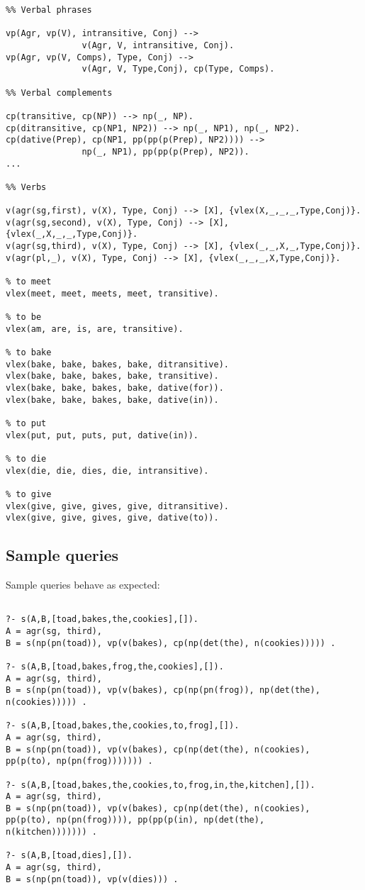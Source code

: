 \documentclass[12pt]{article}
\makeatletter
\newenvironment{problem x}{\@startsection
       {section}
       {1}
       {-.2em}
       {-3.5ex plus -1ex minus -.2ex}
       {2.3ex plus .2ex}
       {\pagebreak[3] %
       \large\bf\noindent{Problem }
       }
       }
       {%
       \begin{center}\large\bf \ldots\ldots\ldots\end{center}}
\makeatother
\begin{document}
    \begin{verbatim}
%% Verbal phrases

vp(Agr, vp(V), intransitive, Conj) -->
               v(Agr, V, intransitive, Conj).
vp(Agr, vp(V, Comps), Type, Conj) -->
               v(Agr, V, Type,Conj), cp(Type, Comps).

%% Verbal complements

cp(transitive, cp(NP)) --> np(_, NP).
cp(ditransitive, cp(NP1, NP2)) --> np(_, NP1), np(_, NP2).
cp(dative(Prep), cp(NP1, pp(pp(p(Prep), NP2)))) -->
               np(_, NP1), pp(pp(p(Prep), NP2)).
...

%% Verbs

v(agr(sg,first), v(X), Type, Conj) --> [X], {vlex(X,_,_,_,Type,Conj)}.
v(agr(sg,second), v(X), Type, Conj) --> [X], {vlex(_,X,_,_,Type,Conj)}.
v(agr(sg,third), v(X), Type, Conj) --> [X], {vlex(_,_,X,_,Type,Conj)}.
v(agr(pl,_), v(X), Type, Conj) --> [X], {vlex(_,_,_,X,Type,Conj)}.

% to meet
vlex(meet, meet, meets, meet, transitive).

% to be
vlex(am, are, is, are, transitive).

% to bake
vlex(bake, bake, bakes, bake, ditransitive).
vlex(bake, bake, bakes, bake, transitive).
vlex(bake, bake, bakes, bake, dative(for)).
vlex(bake, bake, bakes, bake, dative(in)).

% to put
vlex(put, put, puts, put, dative(in)).

% to die
vlex(die, die, dies, die, intransitive).

% to give
vlex(give, give, gives, give, ditransitive).
vlex(give, give, gives, give, dative(to)).
    \end{verbatim}
  \subsection*{Sample queries}

    Sample queries behave as expected:
  \begin{verbatim}

?- s(A,B,[toad,bakes,the,cookies],[]).
A = agr(sg, third),
B = s(np(pn(toad)), vp(v(bakes), cp(np(det(the), n(cookies))))) .

?- s(A,B,[toad,bakes,frog,the,cookies],[]).
A = agr(sg, third),
B = s(np(pn(toad)), vp(v(bakes), cp(np(pn(frog)), np(det(the), 
n(cookies))))) .

?- s(A,B,[toad,bakes,the,cookies,to,frog],[]).
A = agr(sg, third),
B = s(np(pn(toad)), vp(v(bakes), cp(np(det(the), n(cookies), 
pp(p(to), np(pn(frog))))))) .

?- s(A,B,[toad,bakes,the,cookies,to,frog,in,the,kitchen],[]).
A = agr(sg, third),
B = s(np(pn(toad)), vp(v(bakes), cp(np(det(the), n(cookies), 
pp(p(to), np(pn(frog)))), pp(pp(p(in), np(det(the), 
n(kitchen))))))) .

?- s(A,B,[toad,dies],[]).
A = agr(sg, third),
B = s(np(pn(toad)), vp(v(dies))) .
  \end{verbatim}
\end{document}

